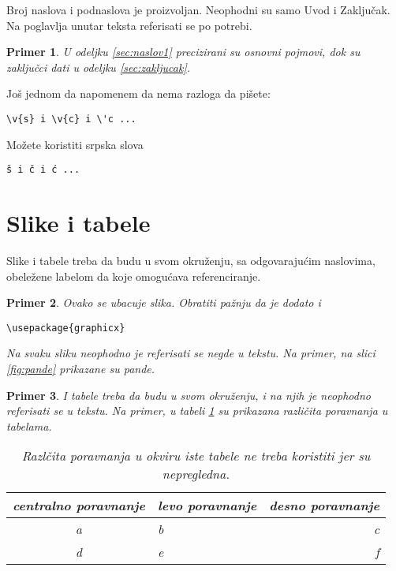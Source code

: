 \documentclass[a4paper]{article}
\newtheorem{primer}{Primer}[section]
\begin{document}
Broj naslova i podnaslova je proizvoljan. Neophodni su samo Uvod i Zaključak. Na poglavlja unutar teksta referisati se po potrebi. 
\begin{primer}
U odeljku \ref{sec:naslov1} precizirani su osnovni pojmovi, dok su zaključci dati u odeljku \ref{sec:zakljucak}.
\end{primer}

Još jednom da napomenem da nema razloga da pišete:
\begin{verbatim}
\v{s} i \v{c} i \'c ...
\end{verbatim}
Možete koristiti srpska slova
\begin{verbatim}
š i č i ć ... 
\end{verbatim}



\section{Slike i tabele}
\label{slike_i_tabele}

Slike i tabele treba da budu u svom okruženju, sa odgovarajućim naslovima, obeležene labelom da koje omogućava referenciranje. 

\begin{primer} Ovako se ubacuje slika. Obratiti pažnju da je dodato i 
\begin{verbatim}
\usepackage{graphicx}
\end{verbatim}

Na svaku sliku neophodno je referisati se negde u tekstu. Na primer, na slici \ref{fig:pande} prikazane su pande. 
\end{primer}

\begin{primer} I tabele treba da budu u svom okruženju, i na njih je neophodno referisati se u tekstu. Na primer, u tabeli \ref{tab:tabela1} su prikazana različita poravnanja u tabelama.

\begin{table}[h!]
\begin{center}
\caption{Razlčita poravnanja u okviru iste tabele ne treba koristiti jer su nepregledna.}
\begin{tabular}{|c|l|r|} \hline
centralno poravnanje& levo poravnanje& desno poravnanje\\ \hline
a &b&c\\ \hline
d &e&f\\ \hline
\end{tabular}
\label{tab:tabela1}
\end{center}
\end{table}

\end{primer}
\end{document}
